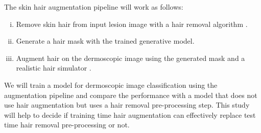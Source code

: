 The skin hair augmentation pipeline will work as follows:
\begin{enumerate}[i.]
	\item Remove skin hair from input lesion image with a hair removal algorithm \cite{Li2021a}.
	\item Generate a hair mask with the trained generative model.
	\item Augment hair on the dermoscopic image using the generated mask and a realistic hair simulator \cite{Attia2020}.
\end{enumerate}
We will train a model for dermoscopic image classification using the augmentation pipeline and compare the performance with a model that does not use hair augmentation but uses a hair removal pre-processing step. This study will help to decide if training time hair augmentation can effectively replace test time hair removal pre-processing or not.


